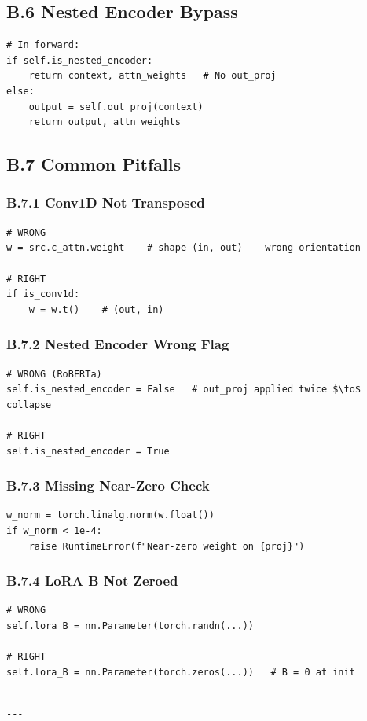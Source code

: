 \subsection{B.6 Nested Encoder Bypass}

\begin{lstlisting}
# In forward:
if self.is_nested_encoder:
    return context, attn_weights   # No out_proj
else:
    output = self.out_proj(context)
    return output, attn_weights
\end{lstlisting}

\subsection{B.7 Common Pitfalls}

\subsubsection{B.7.1 Conv1D Not Transposed}

\begin{lstlisting}
# WRONG
w = src.c_attn.weight    # shape (in, out) -- wrong orientation

# RIGHT
if is_conv1d:
    w = w.t()    # (out, in)
\end{lstlisting}

\subsubsection{B.7.2 Nested Encoder Wrong Flag}

\begin{lstlisting}
# WRONG (RoBERTa)
self.is_nested_encoder = False   # out_proj applied twice $\to$ collapse

# RIGHT
self.is_nested_encoder = True
\end{lstlisting}

\subsubsection{B.7.3 Missing Near-Zero Check}

\begin{lstlisting}
w_norm = torch.linalg.norm(w.float())
if w_norm < 1e-4:
    raise RuntimeError(f"Near-zero weight on {proj}")
\end{lstlisting}

\subsubsection{B.7.4 LoRA B Not Zeroed}

\begin{lstlisting}
# WRONG
self.lora_B = nn.Parameter(torch.randn(...))

# RIGHT
self.lora_B = nn.Parameter(torch.zeros(...))   # B = 0 at init
\end{lstlisting}
\begin{lstlisting}

---
\end{lstlisting}